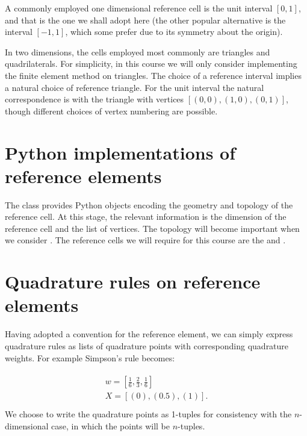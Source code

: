 \documentclass{book}
\begin{document}
A commonly employed one dimensional reference cell is the unit
interval \([0,1]\), and that is the one we shall adopt here (the
other popular alternative is the interval \([-1, 1]\), which some
prefer due to its symmetry about the origin).

In two dimensions, the cells employed most commonly are triangles and
quadrilaterals. For simplicity, in this course we will only consider
implementing the finite element method on triangles. The choice of a
reference interval implies a natural choice of reference triangle. For
the unit interval the natural correspondence is with the triangle with
vertices \([(0,0), (1,0), (0,1)]\), though different choices of
vertex numbering are possible.


\section{Python implementations of reference elements}
\label{\detokenize{1_quadrature:python-implementations-of-reference-elements}}
The  class provides
Python objects encoding the geometry and topology of the reference
cell. At this stage, the relevant information is the dimension of the
reference cell and the list of vertices. The topology will become
important when we consider {\hyperref[\detokenize{3_meshes::doc}]{}}. The reference cells we will
require for this course are the
 and
.


\section{Quadrature rules on reference elements}
\label{\detokenize{1_quadrature:quadrature-rules-on-reference-elements}}
Having adopted a convention for the reference element, we can simply
express quadrature rules as lists of quadrature points with
corresponding quadrature weights. For example Simpson’s rule becomes:

\label{\detokenize{1_quadrature:equation-1_quadrature:1}}\begin{align}\label{equation:1_quadrature:1_quadrature:1}\!\begin{aligned}
w = \left[ \frac{1}{6}, \frac{2}{3}, \frac{1}{6} \right]\\
X = \left[ (0), (0.5), (1)\right].\\
\end{aligned}\end{align}
We choose to write the quadrature points as 1-tuples for consistency
with the \(n\)-dimensional case, in which the points will be
\(n\)-tuples.
\end{document}
